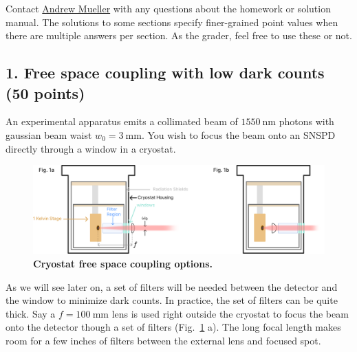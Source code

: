 \documentclass[11pt]{caltech_thesis} %
\begin{document}
{\color{midnightblue} Contact
\href{mailto:andrewstermueller@gmail.com}{Andrew Mueller} with any
questions about the homework or solution manual. The solutions to some
sections specify finer-grained point values when there are multiple
answers per section. As the grader, feel free to use these or not. }

\hypertarget{free-space-coupling-with-low-dark-counts-50-points}{%
\subsection{1. Free space coupling with low dark counts (50
points)}\label{free-space-coupling-with-low-dark-counts-50-points}}

An experimental apparatus emits a collimated beam of
\(1550~\mathrm{nm}\) photons with gaussian beam waist
\(w_0 = 3~\mathrm{mm}\). You wish to focus the beam onto an SNSPD
directly through a window in a cryostat.

\hypertarget{fig:cryostat_concept}{%
\begin{figure}
\centering
\includegraphics{chapter_05/figs_05/fig1b_light.pdf}
\caption[{Cryostat optical coupling}]{\textbf{Cryostat free space
coupling options.}}
\label{fig:cryostat_concept}
\end{figure}
}

As we will see later on, a set of filters will be needed between the
detector and the window to minimize dark counts. In practice, the set of
filters can be quite thick. Say a \(f = 100~\mathrm{mm}\) lens is used
right outside the cryostat to focus the beam onto the detector though a
set of filters (Fig.~\ref{fig:cryostat_concept} a). The long focal
length makes room for a few inches of filters between the external lens
and focused spot.
\end{document}
